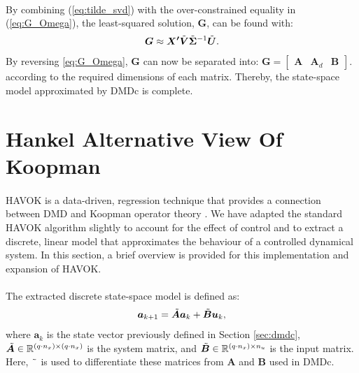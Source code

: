     \paragraph{}
    By combining (\ref{eq:tilde_svd}) with the over-constrained equality in (\ref{eq:G_Omega}), 
    the least-squared solution, $\bm{G}$, can be found with:
    \begin{equation}
        \bm{G} \approx \bm{X^\prime} \Tilde{\bm{V}} \Tilde{\bm{\Sigma}}^{-1} \Tilde{\bm{U}} .
    \end{equation}
    By reversing \ref{eq:G_Omega}, $\bm{G}$ can now be separated into:
    \(
        \bm{G} = \begin{bmatrix} \bm{A} & \bm{A}_d & \bm{B} \end{bmatrix}.
    \)
    according to the required dimensions of each matrix.
    Thereby, the state-space model approximated by DMDc is complete.
    
\section{Hankel Alternative View Of Koopman}
    
    
    \paragraph{}
    HAVOK is a data-driven, regression technique that provides a connection between DMD and Koopman operator theory \cite{Brunton2017a, Champion2019}. 
    We have adapted the standard HAVOK algorithm slightly to account for the effect of control and to extract a discrete, linear model that approximates the behaviour of a controlled dynamical system.
    In this section, a brief overview is provided for this implementation and expansion of \mbox{HAVOK}.
    \paragraph{}
    The extracted discrete state-space model is defined as:
    \begin{equation} \label{eq:havoc_state_space}
        \bm{a}_{k+1} = \Tilde{\bm{A}} \bm{a}_k + \Tilde{\bm{B}} \bm{u}_k ,
    \end{equation}
    where $\bm{a}_k$ is the state vector previously defined in Section \ref{sec:dmdc}, 
    \( \Tilde{\bm{A}} \in \mathbb{R}^{(q \cdot n_x) \times (q \cdot n_x)} \) is the system matrix, 
    and \( \Tilde{\bm{B}} \in \mathbb{R}^{(q \cdot n_x) \times n_u} \) is the input matrix. 
    Here, $\Tilde{\phantom{a}}$ is used to differentiate these matrices from $\bm{A}$ and $\bm{B}$ used in DMDc.
